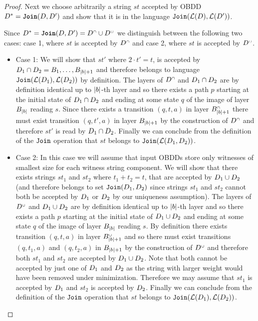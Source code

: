 \begin{proof}
    Next we choose arbitrarily a string $st$ accepted by OBDD $D^* = \texttt{\textbf{Join}}(D,D')$ and show that it is in the language $\texttt{Join}(\mathcal{L}(D),\mathcal{L}(D'))$.

    Since $D^* = \texttt{\textbf{Join}}(D,D') = D^{{\scriptscriptstyle\cap}} \cup D^{{\scriptscriptstyle\cup}}$ we distinguish between the following two cases: case 1, where $st$ is accepted by $D^{\scriptscriptstyle\cap}$ and case 2, where $st$ is accepted by $D^{\scriptscriptstyle\cup}$.
    \begin{itemize}
        \item Case 1: We will show that $st'$ where $2 \cdot t' = t$, is accepted by $D_1 \cap D_2 = B_1,\ldots,B_{|b|+1}$ and therefore belongs to language $\texttt{Join}(\mathcal{L}(D_1),\mathcal{L}(D_2))$ by definition. The layers of $D^{\scriptscriptstyle\cap}$ and $D_1 \cap D_2$ are by definition identical up to $|b|$-th layer and so there exists a path $p$ starting at the initial state of $D_1 \cap D_2$ and ending at some state $q$ of the image of layer $B_{|b|}$ reading $s$. Since there exists a transition $(q,t,a)$ in layer $B_{|b|+1}^{\scriptscriptstyle\cap}$ there must exist transition $(q,t',a)$ in layer $B_{|b|+1}$ by the construction of $D^{\scriptscriptstyle\cap}$ and therefore $st'$ is read by $D_1 \cap D_2$. Finally we can conclude from the definition of the $\texttt{Join}$ operation that $st$ belongs to $\texttt{Join}(\mathcal{L}(D_1,D_2))$.
        
        
        \item Case 2: In this case we will assume that input OBDDs store only witnesses of smallest size for each witness string component. We will show that there exists strings $st_1$ and $st_2$ where $t_1 + t_2 = t$, that are accepted by $D_1\cup D_2$ (and therefore belongs to set $\texttt{Join}(D_1,D_2)$ since strings $st_1$ and $st_2$ cannot both be accepted by $D_1$ or $D_2$ by our uniqueness assumption). The layers of $D^{\scriptscriptstyle\cup}$ and $D_1 \cup D_2$ are by definition identical up to $|b|$-th layer and so there exists a path $p$ starting at the initial state of $D_1 \cup D_2$ and ending at some state $q$ of the image of layer $B_{|b|}$ reading $s$. By definition there exists transition $(q,t,a)$ in layer $B_{|b|+1}^{\scriptscriptstyle\cup}$ and so there must exist transitions $(q,t_1,a)$ and $(q,t_2,a)$ in $B_{|b|+1}$ by the construction of $D^{\scriptscriptstyle\cup}$ and therefore both $st_1$ and $st_2$ are accepted by $D_1 \cup D_2$. Note that both cannot be accepted by just one of $D_1$ and $D_2$ as the string with larger weight would have been removed under minimization. Therefore we may assume that $st_1$ is accepted by $D_1$ and $st_2$ is accepted by $D_2$. Finally we can conclude from the definition of the $\texttt{Join}$ operation that $st$ belongs to $\texttt{Join}(\mathcal{L}(D_1),\mathcal{L}(D_2))$. 
        

\end{itemize}
\end{proof}
